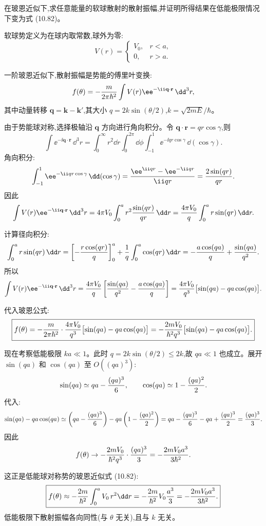 \begin{question}
在玻恩近似下,求任意能量的软球散射的散射振幅,并证明所得结果在低能极限情况下变为式 (10.82)。

\par\smallskip
{}

\end{question}
\begin{solution}
软球势定义为在球内取常数,球外为零:
\[
V(r)=\begin{cases}
V_0,& r<a,\\
0,& r>a.
\end{cases}
\]

一阶玻恩近似下,散射振幅是势能的傅里叶变换:
\[
f(\theta)=-{m\over2\pi\hbar^2}\int V(r)\ee^{-\ii\mathbf q\cdot\mathbf r}\,\dd^3r,
\]
其中动量转移 $\mathbf q=\mathbf k-\mathbf k'$,其大小 $q=2k\sin(\theta/2)$,$k=\sqrt{2mE}/\hbar$。

由于势能球对称,选择极轴沿 $\mathbf q$ 方向进行角向积分。令 $\mathbf q\cdot\mathbf r=qr\cos\gamma$,则
\[
\int \ee^{-\ii\mathbf q\cdot\mathbf r}\,\dd^3r
=\int_0^\infty r^2\dd r\int_0^{2\pi}\dd\phi\int_{-1}^{1}\ee^{-\ii qr\cos\gamma}\,\dd(\cos\gamma).
\]
角向积分:
\[
\int_{-1}^{1}\ee^{-\ii qr\cos\gamma}\,\dd(\cos\gamma)
={\ee^{\ii qr}-\ee^{-\ii qr}\over\ii qr}={2\sin(qr)\over qr}.
\]
因此
\[
\int V(r)\ee^{-\ii\mathbf q\cdot\mathbf r}\,\dd^3r
=4\pi V_0\int_0^a r^2{\sin(qr)\over qr}\,\dd r
={4\pi V_0\over q}\int_0^a r\sin(qr)\,\dd r.
\]

计算径向积分:
\[
\int_0^a r\sin(qr)\,\dd r
=\left[-{r\cos(qr)\over q}\right]_0^a+{1\over q}\int_0^a\cos(qr)\,\dd r
=-{a\cos(qa)\over q}+{\sin(qa)\over q^2}.
\]
所以
\[
\int V(r)\ee^{-\ii\mathbf q\cdot\mathbf r}\,\dd^3r
={4\pi V_0\over q}\left[{\sin(qa)\over q^2}-{a\cos(qa)\over q}\right]
={4\pi V_0\over q^3}\bigl[\sin(qa)-qa\cos(qa)\bigr].
\]

代入玻恩公式:
\[
\boxed{f(\theta)=-{m\over2\pi\hbar^2}\cdot{4\pi V_0\over q^3}\bigl[\sin(qa)-qa\cos(qa)\bigr]
=-{2mV_0\over\hbar^2q^3}\bigl[\sin(qa)-qa\cos(qa)\bigr].}
\]

现在考察低能极限 $ka\ll1$。此时 $q=2k\sin(\theta/2)\le2k$,故 $qa\ll1$ 也成立。展开 $\sin(qa)$ 和 $\cos(qa)$ 至 $O((qa)^3)$:
\[
\sin(qa)\simeq qa-{(qa)^3\over6},\qquad
\cos(qa)\simeq1-{(qa)^2\over2}.
\]
代入:
\[
\sin(qa)-qa\cos(qa)
\simeq\left(qa-{(qa)^3\over6}\right)-qa\left(1-{(qa)^2\over2}\right)
=qa-{(qa)^3\over6}-qa+{(qa)^3\over2}
={(qa)^3\over3}.
\]
因此
\[
f(\theta)\to-{2mV_0\over\hbar^2q^3}\cdot{(qa)^3\over3}
=-{2mV_0a^3\over3\hbar^2}.
\]

这正是低能球对称势的玻恩近似式 (10.82):
\[
\boxed{f(\theta)\approx-{2m\over\hbar^2}\int_0^a V_0\,r^2\dd r
=-{2m\over\hbar^2}V_0{a^3\over3}
=-{2mV_0a^3\over3\hbar^2}.}
\]
低能极限下散射振幅各向同性(与 $\theta$ 无关),且与 $k$ 无关。
\end{solution}

